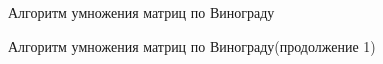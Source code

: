 \documentclass[12pt]{report}
\begin{document}
\newpage
\begin{figure}[h]
	\caption{Алгоритм умножения матриц по Винограду}
	\label{figure:image}
\end{figure}

\newpage
\begin{figure}[h]
	\caption{Алгоритм умножения матриц по Винограду(продолжение 1)}
	\label{figure:image}
\end{figure}
\end{document}
